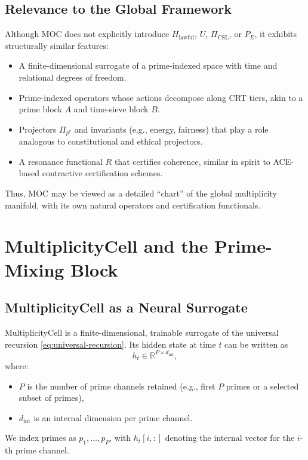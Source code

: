 \documentclass[11pt]{article}
\begin{document}
\subsection{Relevance to the Global Framework}

Although MOC does not explicitly introduce \(H_{\text{lawful}}\), \(U\),
\(\Pi_{\text{CSL}}\), or \(P_E\), it exhibits structurally similar features:
\begin{itemize}[leftmargin=1.5em]
  \item A finite-dimensional surrogate of a prime-indexed space with time and
  relational degrees of freedom.
  \item Prime-indexed operators whose actions decompose along CRT tiers, akin
  to a prime block \(A\) and time-sieve block \(B\).
  \item Projectors \(\Pi_{p^r}\) and invariants (e.g., energy, fairness) that
  play a role analogous to constitutional and ethical projectors.
  \item A resonance functional \(R\) that certifies coherence, similar in
  spirit to ACE-based contractive certification schemes.
\end{itemize}

Thus, MOC may be viewed as a detailed ``chart'' of the global multiplicity
manifold, with its own natural operators and certification functionals.

\section{MultiplicityCell and the Prime-Mixing Block}

\subsection{MultiplicityCell as a Neural Surrogate}

MultiplicityCell is a finite-dimensional, trainable surrogate of the universal
recursion \eqref{eq:universal-recursion}. Its hidden state at time \(t\) can
be written as
\[
  h_t \in \mathbb{R}^{P \times d_{\text{int}}},
\]
where:
\begin{itemize}[leftmargin=1.5em]
  \item \(P\) is the number of prime channels retained (e.g., first \(P\)
  primes or a selected subset of primes),
  \item \(d_{\text{int}}\) is an internal dimension per prime channel.
\end{itemize}
We index primes as \(p_1,\dots,p_P\), with \(h_t[i,:]\) denoting the internal
vector for the \(i\)-th prime channel.
\end{document}
